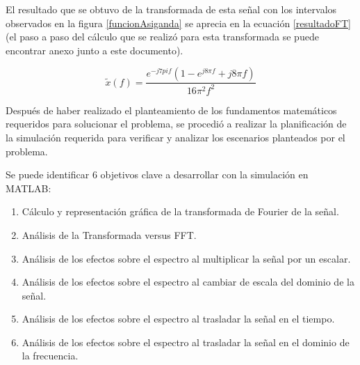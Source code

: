 \documentclass[11pt,letterpaper,twocolumn]{article}
\begin{document}
    El resultado que se obtuvo de la transformada de esta señal con los intervalos observados en la
    figura \ref{funcionAsiganda} se aprecia en la ecuación \ref{resultadoFT} (el paso a paso del cálculo que se 
    realizó para esta transformada se puede encontrar anexo junto a este documento).
    
    \begin{equation}
        \tilde{x}(f) = \frac{e^{-j7pi f }(1 - e^{j8\pi f} + j8\pi f)}{16\pi^2 f^2}
        \label{resultadoFT}
    \end{equation} 
   
    Después de haber realizado el planteamiento de los fundamentos matemáticos requeridos para solucionar
    el problema, se procedió a realizar la planificación de la simulación requerida para verificar y analizar
    los escenarios planteados por el problema. 
    
    
    Se puede identificar 6 objetivos clave a desarrollar con la simulación en MATLAB:
    
    \begin{enumerate}
        \item Cálculo y representación gráfica de la transformada de Fourier de la señal.
        \item Análisis de la Transformada versus FFT. 
        \item Análisis de los efectos sobre el espectro al multiplicar la señal por un escalar.
        \item Análisis de los efectos sobre el espectro al cambiar de escala del dominio de la señal.
        \item Análisis de los efectos sobre el espectro al trasladar la señal en el tiempo.
        \item Análisis de los efectos sobre el espectro al trasladar la señal en el dominio de la frecuencia.
    \end{enumerate}
    
\end{document}
